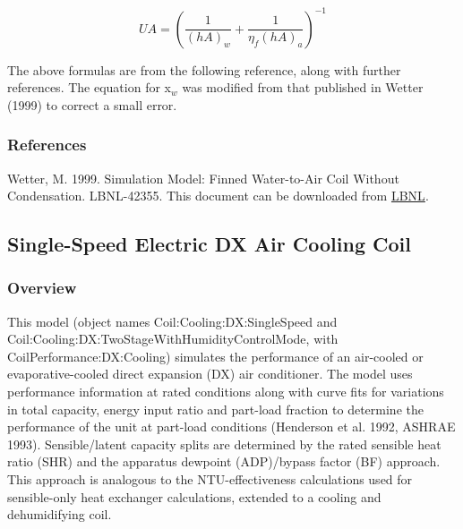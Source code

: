\begin{equation}
UA = {\left( {\frac{1}{{{{\left( {hA} \right)}_w}}} + \frac{1}{{{\eta_f}{{\left( {hA} \right)}_a}}}} \right)^{ - 1}}
\end{equation}

The above formulas are from the following reference, along with further references. The equation for x\(_{w}\) was modified from that published in Wetter (1999) to correct a small error.

\subsubsection{References}\label{references-1-004}

Wetter, M. 1999. Simulation Model: Finned Water-to-Air Coil Without Condensation. LBNL-42355. This document can be downloaded from \href{http://simulationresearch.lbl.gov}{LBNL}.

\subsection{Single-Speed Electric DX Air Cooling Coil}\label{single-speed-electric-dx-air-cooling-coil}

\subsubsection{Overview}\label{overview-1-004}

This model (object names Coil:Cooling:DX:SingleSpeed and \\ Coil:Cooling:DX:TwoStageWithHumidityControlMode, with CoilPerformance:DX:Cooling) simulates the performance of an air-cooled or evaporative-cooled direct expansion (DX) air conditioner. The model uses performance information at rated conditions along with curve fits for variations in total capacity, energy input ratio and part-load fraction to determine the performance of the unit at part-load conditions (Henderson et al. 1992, ASHRAE 1993). Sensible/latent capacity splits are determined by the rated sensible heat ratio (SHR) and the apparatus dewpoint (ADP)/bypass factor (BF) approach. This approach is analogous to the NTU-effectiveness calculations used for sensible-only heat exchanger calculations, extended to a cooling and dehumidifying coil.

